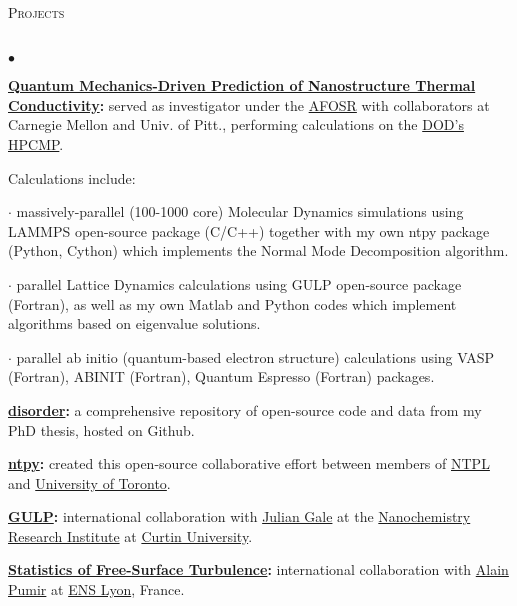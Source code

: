 \documentclass{article}
\newcommand{\lineunder}{\vspace*{-8pt} \\ \hspace*{-18pt} \hrulefill \\}
\newcommand{\header}[1]{{\hspace*{-15pt}\vspace*{6pt} \textsc{#1}} \vspace*{-6pt} \lineunder}
\newenvironment{achievements}{\begin{list}{$\bullet$}{\topsep 0pt \itemsep -2pt}}{\vspace*{4pt}\end{list}}
\begin{document}
\header{Projects}
\begin{achievements}

\item \textbf{\href{http://ntpl.me.cmu.edu/research.html}{Quantum Mechanics-Driven Prediction of Nanostructure Thermal Conductivity}:}
served as investigator under the 
\href{http://www.wpafb.af.mil/afrl/afosr/}{AFOSR} with collaborators at Carnegie Mellon and Univ. of Pitt., performing 
calculations on the \href{http://www.hpcmo.hpc.mil/cms2/index.php}{DOD's HPCMP}.

Calculations include:

$\cdot$ massively-parallel (100-1000 core) Molecular Dynamics simulations using LAMMPS 
open-source package (C/C++) together with my own ntpy package (Python, Cython) which 
implements the Normal Mode Decomposition algorithm.

$\cdot$ parallel Lattice Dynamics calculations using GULP open-source package (Fortran),  
as well as my own Matlab and Python codes which implement algorithms based 
on eigenvalue solutions.

$\cdot$ parallel ab initio (quantum-based electron structure) calculations using VASP (Fortran), 
ABINIT (Fortran), Quantum Espresso (Fortran) packages. 

\item \textbf{\href{https://github.com/jasonlarkin/disorder}{disorder}:} a comprehensive repository of open-source code and data from my PhD thesis, hosted on Github.

\item \textbf{\href{https://github.com/ntpl/ntpy}{ntpy}:} created this open-source  collaborative effort between members of \href{http://ntpl.me.cmu.edu/}{NTPL} and \href{http://www.mie.utoronto.ca/labs/atoms/}{University of Toronto}.

\item \textbf{\href{http://projects.ivec.org/gulp/}{GULP}:} international collaboration with \href{http://nanochemistry.curtin.edu.au/people/staff.cfm/J.Gale}{Julian Gale} at the 
\href{http://nanochemistry.curtin.edu.au/}{Nanochemistry Research Institute} at \href{http://www.curtin.edu.au/}{Curtin University}.

\item \textbf{\href{http://jasonlarkin.github.io/projects-ms.html}{Statistics of Free-Surface Turbulence}:} international collaboration with \href{http://perso.ens-lyon.fr/alain.pumir/Pumir_webpage.html}{Alain Pumir} at \href{http://www.ens-lyon.eu/annuaire/m-pumir-alain-83656.kjsp?RH=ZYZYZYZYZYZYZYZYZYZYZY}{ENS Lyon}, France.


\end{achievements}
\end{document}
